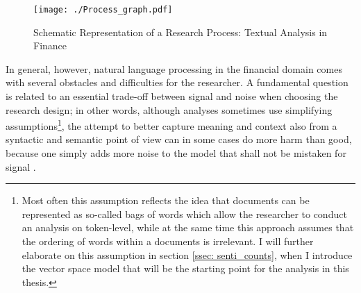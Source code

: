 
\begin{figure}[H]
	\centering
		\texttt{[image: ./Process\_graph.pdf]}
		\caption{Schematic Representation of a Research Process: Textual Analysis in Finance}
		\label{fig: process_schema}
\end{figure}

In general, however, natural language processing in the financial domain comes with several obstacles and difficulties for the researcher. A fundamental question is related to an essential trade-off between signal and noise when choosing the research design; in other words, although analyses sometimes use simplifying assumptions\footnote{Most often this assumption reflects the idea that documents can be represented as so-called bags of words which allow the researcher to conduct an analysis on token-level, while at the same time this approach assumes that the ordering of words within a documents is irrelevant. I will further elaborate on this assumption in section \ref{ssec: senti_counts}, when I introduce the vector space model that will be the starting point for the analysis in this thesis.}, the attempt to better capture meaning and context also from a syntactic and semantic point of view can in some cases do more harm than good, because one simply adds more noise to the model that shall not be mistaken for signal \parencite{LM-meta-2016}. 

